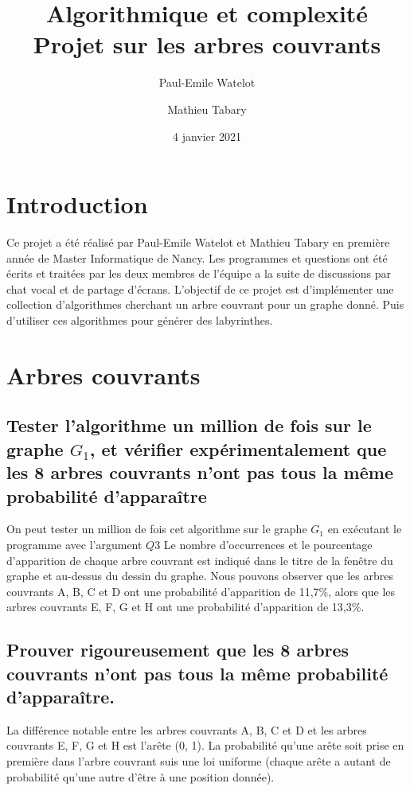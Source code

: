 \documentclass[a4paper,11pt]{article}
\title{Algorithmique et complexité Projet sur les arbres couvrants}
\author{Paul-Emile Watelot \and Mathieu Tabary}
\date{4 janvier 2021}
\begin{document}
    \maketitle
    \newpage
    \tableofcontents
    \newpage

    \section{Introduction}\label{sec:introduction}
        Ce projet a été réalisé par Paul-Emile Watelot et Mathieu Tabary en première année de Master Informatique de Nancy.
        Les programmes et questions ont été écrits et traitées par les deux membres de l'équipe a la suite de discussions par chat vocal et de partage d'écrans.
        L'objectif de ce projet est d'implémenter une collection d'algorithmes cherchant un arbre couvrant pour un graphe donné.
        Puis d'utiliser ces algorithmes pour générer des labyrinthes.
    
    \section{Arbres couvrants}\label{sec:arbres-couvrants}
        
        \newpage

        \subsection{Tester l'algorithme un million de fois sur le graphe $G_1$,
        et vérifier expérimentalement que les 8 arbres couvrants n'ont pas tous la même probabilité d'apparaître}\label{subsec:Q3}
            On peut tester un million de fois cet algorithme sur le graphe $G_1$ en exécutant le programme avec l'argument $Q3$
            Le nombre d'occurrences et le pourcentage d'apparition de chaque arbre couvrant est indiqué dans le titre de la fenêtre du graphe et au-dessus du dessin du graphe.
            Nous pouvons observer que les arbres couvrants A, B, C et D ont une probabilité d'apparition de 11,7\%,
            alors que les arbres couvrants E, F, G et H ont une probabilité d'apparition de 13,3\%.

        \subsection{Prouver rigoureusement que les 8 arbres couvrants n'ont pas tous la même probabilité d'apparaître.}\label{subsec:Q4}
            La différence notable entre les arbres couvrants A, B, C et D et les arbres couvrants E, F, G et H est l'arête (0, 1).
            La probabilité qu'une arête soit prise en première dans l'arbre couvrant suis une loi uniforme
            (chaque arête a autant de probabilité qu'une autre d'être à une position donnée).\\
\end{document}
